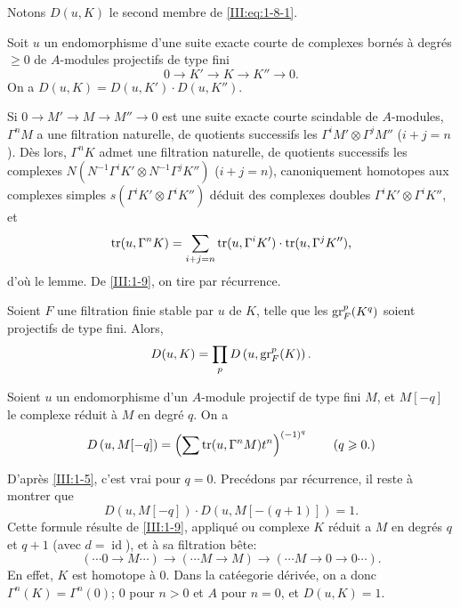 Notons $D(u,K)$ le second membre de \eqref{III:eq:1-8-1}. 





\begin{lemma_}\label{III:1-9}
Soit $u$ un endomorphisme d'une suite exacte courte de complexes born\'es \`a 
degr\'es $\geqslant 0$ de $A$-modules projectifs de type fini 
\[
  0 \to K' \to K \to K'' \to 0 \text{.}
\]
On a $D(u,K)=D(u,K')\cdot D(u,K'')$.
\end{lemma_}

Si $0\to M'\to M\to M''\to 0$ est une suite exacte courte scindable de 
$A$-modules, $\Gamma^n M$ a une filtration naturelle, de quotients successifs 
les $\Gamma^i M'\otimes \Gamma^j M''$ ($i+j=n$). D\`es lors, $\Gamma^n K$ admet 
une filtration naturelle, de quotients successifs les complexes 
$N(N^{-1} \Gamma^i K'\otimes N^{-1}\Gamma^j K'')$ ($i+j=n$), canoniquement 
homotopes aux complexes simples $s(\Gamma^i K'\otimes \Gamma^i K'')$ d\'eduit 
des complexes doubles $\Gamma^i K'\otimes \Gamma^i K''$, et 
\[
  \operatorname{tr}(u,\Gamma^n K) = \sum_{i+j=n} \operatorname{tr}(u,\Gamma^i K')\cdot \operatorname{tr}(u,\Gamma^j K'') \text{,}
\]
d'o\`u le lemme. De \ref{III:1-9}, on tire par r\'ecurrence. 





\begin{lemma_}\label{III:1-10}
Soient $F$ une filtration finie stable par $u$ de $K$, telle que les 
$\operatorname{gr}_F^p(K^q)$ soient projectifs de type fini. Alors, 
\[
  D(u,K) = \prod_p D\left(u,\operatorname{gr}_F^p(K)\right) \text{.}
\]
\end{lemma_}





\begin{lemma_}\label{III:1-11}
Soient $u$ un endomorphisme d'un $A$-module projectif de type fini $M$, et 
$M[-q]$ le complexe r\'eduit \`a $M$ en degr\'e $q$. On a 
\[
  D\left(u,M[-q]\right) = \left(\sum \operatorname{tr}(u,\Gamma^n M) t^n\right)^{(-1)^q} \qquad \text{($q\geqslant 0$.)}
\]
\end{lemma_}





D'apr\`es \ref{III:1-5}, c'est vrai pour $q=0$. Prec\'edons par r\'ecurrence, il 
reste \`a montrer que 
\[
  D\left(u,M[-q]\right) \cdot D\left(u,M[-(q+1)]\right) = 1 \text{.}
\]
Cette formule r\'esulte de \ref{III:1-9}, appliqu\'e ou complexe $K$ r\'eduit a 
$M$ en degr\'es $q$ et $q+1$ (avec $d=\operatorname{id}$), et \`a sa 
filtration b\^ete:
\[
  (\cdots 0 \to M \cdots) \to (\cdots M \to M) \to (\cdots M \to 0 \to 0 \cdots) \text{.}
\]
En effet, $K$ est homotope \`a $0$. Dans la cat\'eegorie d\'eriv\'ee, on a donc 
$\Gamma^n(K)=\Gamma^n(0)$; $0$ pour $n>0$ et $A$ pour $n=0$, et $D(u,K)=1$. 





